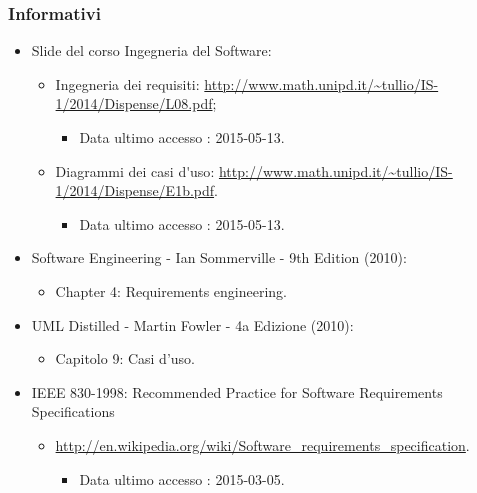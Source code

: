 \subsubsection{Informativi}
\begin{itemize}
	\item \gls{Slide} del corso Ingegneria del Software:
	\begin{itemize}
		\item Ingegneria dei requisiti: \url{http://www.math.unipd.it/~tullio/IS-1/2014/Dispense/L08.pdf};
		\begin{itemize}
			\item Data ultimo accesso : 2015-05-13.						
		\end{itemize}
		\item Diagrammi dei \gls{casi d'uso}: \url{http://www.math.unipd.it/~tullio/IS-1/2014/Dispense/E1b.pdf}.
		\begin{itemize}
			\item Data ultimo accesso : 2015-05-13.						
		\end{itemize}
	\end{itemize}
	\item Software Engineering - Ian Sommerville - 9th Edition (2010):
	\begin{itemize}
		\item Chapter 4: Requirements engineering.
	\end{itemize}
	\item \gls{UML} Distilled - Martin Fowler - 4a Edizione (2010):
	\begin{itemize}
		\item Capitolo 9: Casi d’uso.
	\end{itemize}
	\item IEEE 830-1998: Recommended Practice for Software Requirements Specifications
	\begin{itemize}
		\item \url{http://en.wikipedia.org/wiki/Software_requirements_specification}.
		\begin{itemize}
			\item Data ultimo accesso : 2015-03-05.						
		\end{itemize}
	\end{itemize}
\end{itemize}

